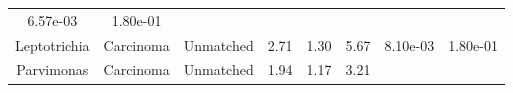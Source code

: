 \documentclass[12pt,]{article}
\begin{document}
\begin{longtable}[]{@{}cccccccc@{}}
\begin{minipage}[t]{0.06\columnwidth}
6.57e-03\strut
\end{minipage} & \begin{minipage}[t]{0.06\columnwidth}\centering\strut
1.80e-01\strut
\end{minipage}\tabularnewline
\begin{minipage}[t]{0.18\columnwidth}\centering\strut
Leptotrichia\strut
\end{minipage} & \begin{minipage}[t]{0.07\columnwidth}\centering\strut
Carcinoma\strut
\end{minipage} & \begin{minipage}[t]{0.09\columnwidth}\centering\strut
Unmatched\strut
\end{minipage} & \begin{minipage}[t]{0.03\columnwidth}\centering\strut
2.71\strut
\end{minipage} & \begin{minipage}[t]{0.14\columnwidth}\centering\strut
1.30\strut
\end{minipage} & \begin{minipage}[t]{0.14\columnwidth}\centering\strut
5.67\strut
\end{minipage} & \begin{minipage}[t]{0.06\columnwidth}\centering\strut
8.10e-03\strut
\end{minipage} & \begin{minipage}[t]{0.06\columnwidth}\centering\strut
1.80e-01\strut
\end{minipage}\tabularnewline
\begin{minipage}[t]{0.18\columnwidth}\centering\strut
Parvimonas\strut
\end{minipage} & \begin{minipage}[t]{0.07\columnwidth}\centering\strut
Carcinoma\strut
\end{minipage} & \begin{minipage}[t]{0.09\columnwidth}\centering\strut
Unmatched\strut
\end{minipage} & \begin{minipage}[t]{0.03\columnwidth}\centering\strut
1.94\strut
\end{minipage} & \begin{minipage}[t]{0.14\columnwidth}\centering\strut
1.17\strut
\end{minipage} & \begin{minipage}[t]{0.14\columnwidth}\centering\strut
3.21\strut
\end{minipage} & \begin{minipage}[t]{0.06\columnwidth}\centering\strut

\end{minipage}
\end{longtable}
\end{document}
